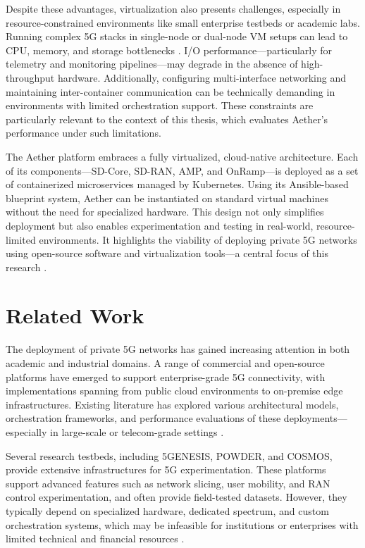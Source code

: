 Despite these advantages, virtualization also presents challenges, especially in resource-constrained environments like small enterprise testbeds or academic labs. Running complex 5G stacks in single-node or dual-node VM setups can lead to CPU, memory, and storage bottlenecks \cite{5g_testbeds_virtualization}. I/O performance—particularly for telemetry and monitoring pipelines—may degrade in the absence of high-throughput hardware. Additionally, configuring multi-interface networking and maintaining inter-container communication can be technically demanding in environments with limited orchestration support. These constraints are particularly relevant to the context of this thesis, which evaluates Aether’s performance under such limitations.

The Aether platform embraces a fully virtualized, cloud-native architecture. Each of its components—SD-Core, SD-RAN, AMP, and OnRamp—is deployed as a set of containerized microservices managed by Kubernetes. Using its Ansible-based blueprint system, Aether can be instantiated on standard virtual machines without the need for specialized hardware. This design not only simplifies deployment but also enables experimentation and testing in real-world, resource-limited environments. It highlights the viability of deploying private 5G networks using open-source software and virtualization tools—a central focus of this research \cite{aether_overview}.


\newpage
\section{Related Work}
\label{sec:related_work}

The deployment of private 5G networks has gained increasing attention in both academic and industrial domains. A range of commercial and open-source platforms have emerged to support enterprise-grade 5G connectivity, with implementations spanning from public cloud environments to on-premise edge infrastructures. Existing literature has explored various architectural models, orchestration frameworks, and performance evaluations of these deployments—especially in large-scale or telecom-grade settings \cite{private5g_trends,5g_architecture_overview}.

Several research testbeds, including 5GENESIS, POWDER, and COSMOS, provide extensive infrastructures for 5G experimentation. These platforms support advanced features such as network slicing, user mobility, and RAN control experimentation, and often provide field-tested datasets. However, they typically depend on specialized hardware, dedicated spectrum, and custom orchestration systems, which may be infeasible for institutions or enterprises with limited technical and financial resources \cite{5g_testbeds_overview}.

